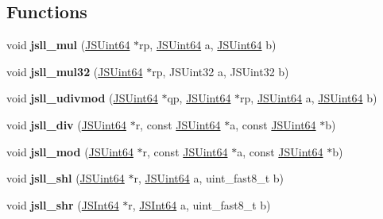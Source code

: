 \subsection*{Functions}
\begin{DoxyCompactItemize}
\item 
\hypertarget{group__zcl__64_ga09e45168abb5ea8e6d487514eae102c8}{void {\bfseries jsll\-\_\-mul} (\hyperlink{struct_j_s_int64}{J\-S\-Uint64} $\ast$rp, \hyperlink{struct_j_s_int64}{J\-S\-Uint64} a, \hyperlink{struct_j_s_int64}{J\-S\-Uint64} b)}\label{group__zcl__64_ga09e45168abb5ea8e6d487514eae102c8}

\item 
\hypertarget{group__zcl__64_ga0b4ed4198b603054301a4c9147e5f060}{void {\bfseries jsll\-\_\-mul32} (\hyperlink{struct_j_s_int64}{J\-S\-Uint64} $\ast$rp, J\-S\-Uint32 a, J\-S\-Uint32 b)}\label{group__zcl__64_ga0b4ed4198b603054301a4c9147e5f060}

\item 
\hypertarget{group__zcl__64_ga26cb84da9083907cc41db0edf95b1b96}{void {\bfseries jsll\-\_\-udivmod} (\hyperlink{struct_j_s_int64}{J\-S\-Uint64} $\ast$qp, \hyperlink{struct_j_s_int64}{J\-S\-Uint64} $\ast$rp, \hyperlink{struct_j_s_int64}{J\-S\-Uint64} a, \hyperlink{struct_j_s_int64}{J\-S\-Uint64} b)}\label{group__zcl__64_ga26cb84da9083907cc41db0edf95b1b96}

\item 
\hypertarget{group__zcl__64_gaf40c23a4a3872380497dae260ea58554}{void {\bfseries jsll\-\_\-div} (\hyperlink{struct_j_s_int64}{J\-S\-Uint64} $\ast$r, const \hyperlink{struct_j_s_int64}{J\-S\-Uint64} $\ast$a, const \hyperlink{struct_j_s_int64}{J\-S\-Uint64} $\ast$b)}\label{group__zcl__64_gaf40c23a4a3872380497dae260ea58554}

\item 
\hypertarget{group__zcl__64_gaecddfb7e3ca39fa5313632c47a47f20c}{void {\bfseries jsll\-\_\-mod} (\hyperlink{struct_j_s_int64}{J\-S\-Uint64} $\ast$r, const \hyperlink{struct_j_s_int64}{J\-S\-Uint64} $\ast$a, const \hyperlink{struct_j_s_int64}{J\-S\-Uint64} $\ast$b)}\label{group__zcl__64_gaecddfb7e3ca39fa5313632c47a47f20c}

\item 
\hypertarget{group__zcl__64_gadbc8463d4ec9862cbb621cdd5f7297fa}{void {\bfseries jsll\-\_\-shl} (\hyperlink{struct_j_s_int64}{J\-S\-Uint64} $\ast$r, \hyperlink{struct_j_s_int64}{J\-S\-Uint64} a, uint\-\_\-fast8\-\_\-t b)}\label{group__zcl__64_gadbc8463d4ec9862cbb621cdd5f7297fa}

\item 
\hypertarget{group__zcl__64_gab406a00beab4086e1f29bfa6c98e0e6d}{void {\bfseries jsll\-\_\-shr} (\hyperlink{struct_j_s_int64}{J\-S\-Int64} $\ast$r, \hyperlink{struct_j_s_int64}{J\-S\-Int64} a, uint\-\_\-fast8\-\_\-t b)}\label{group__zcl__64_gab406a00beab4086e1f29bfa6c98e0e6d}


\end{DoxyCompactItemize}
